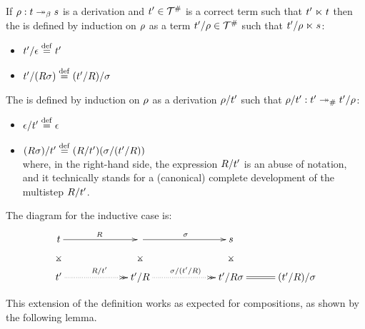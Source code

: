 \begin{definition}
If $\rho : t \mathrel{\twoheadrightarrow_\beta} s$ is a derivation and $t' \in \mathcal{T}^{\mathtt{\#}}$ is
a correct term such that $t' \mathrel{\ltimes} t$
then the  is defined
by induction on $\rho$ as a term $t'/\rho \in \mathcal{T}^{\mathtt{\#}}$ such that $t'/\rho \mathrel{\ltimes} s$:
\begin{itemize}
\item $t'/\epsilon \overset{\mathrm{def}}{=} t'$
\item $t'/(R\sigma) \overset{\mathrm{def}}{=} (t'/R)/\sigma$
\end{itemize}
The  is defined
by induction on $\rho$ as a derivation $\rho/t'$ such that $\rho/t' : t' \mathrel{\twoheadrightarrow_{\mathtt{\#}}} t'/\rho$:
\begin{itemize}
\item $\epsilon/t' \overset{\mathrm{def}}{=} \epsilon$
\item $(R\sigma)/t' \overset{\mathrm{def}}{=} (R/t')(\sigma/(t'/R))$ \\
      where, in the right-hand side,
      the expression $R/t'$ is an abuse of notation,
      and it technically stands for
      a (canonical) complete development of the multistep $R/t'$.
\end{itemize}
The diagram for the inductive case is:
\[
\xymatrix@C=1cm{
 \tm \ar@{}[d]|*=0[@]{\rtimes} \ar[rr]^{\redex} && \ar@{}[d]|*=0[@]{\rtimes} \ar[rr]^{\redseqtwo} && \tmtwo \ar@{}[d]|*=0[@]{\rtimes} \\
 \tm' \ar@{.>>}[rr]^{\redex/\tm'} && \tm'/\redex \ar@{.>>}[rr]^{\sigma/(\tm'/\redex)} && \tm'/\redex\redseqtwo \ar@{=}[r] & (\tm'/\redex)/\redseqtwo \\
}
\]
\end{definition}

This extension of the definition works as expected for compositions,
as shown by the following lemma.

